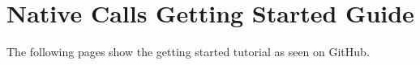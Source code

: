 
\chapter{Native Calls Getting Started Guide}
\label{AppendixA} 

The following pages show the getting started tutorial as seen on GitHub.

